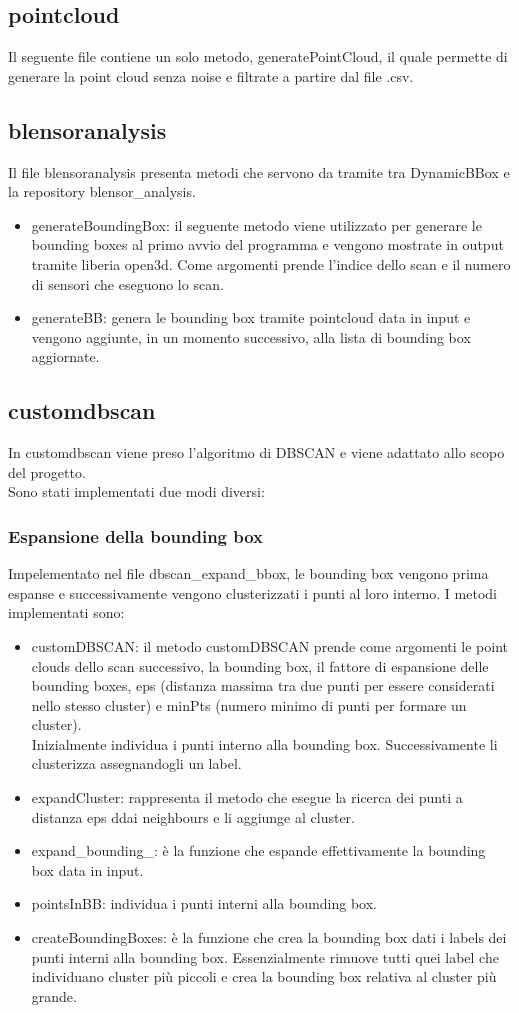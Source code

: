 \documentclass[italian]{article}
\begin{document}
\subsection{pointcloud}
Il seguente file contiene un solo metodo, generatePointCloud, il quale permette di generare la point cloud senza noise e filtrate a partire dal file .csv.\\
\subsection{blensoranalysis}
Il file blensoranalysis presenta metodi che servono da tramite tra DynamicBBox e la repository blensor\_analysis.
\begin{itemize}
		\item generateBoundingBox: il seguente metodo viene utilizzato per generare le bounding boxes al primo avvio del programma e vengono mostrate in output tramite liberia open3d. Come argomenti prende
			l'indice dello scan e il numero di sensori che eseguono lo scan. 
 		\item generateBB: genera le bounding box tramite pointcloud data in input e vengono aggiunte, in un momento successivo, alla lista di bounding box aggiornate.
\end{itemize}
\subsection{customdbscan}
In customdbscan viene preso l'algoritmo di DBSCAN e viene adattato allo scopo del progetto.\\
Sono stati implementati due modi diversi:
\subsubsection{Espansione della bounding box}
Impelementato nel file dbscan\_expand\_bbox, le bounding box vengono prima espanse e successivamente vengono clusterizzati i punti al loro interno.
I metodi implementati sono:
\begin{itemize}
	\item customDBSCAN: il metodo customDBSCAN prende come argomenti le point clouds dello scan successivo, la bounding box, il fattore di espansione delle bounding boxes, eps (distanza massima tra due punti per essere considerati nello stesso cluster) e minPts (numero minimo di punti per formare un cluster).\\ Inizialmente individua i punti interno alla bounding box. Successivamente li clusterizza assegnandogli un label.
	\item expandCluster: rappresenta il metodo che esegue la ricerca dei punti a distanza eps ddai neighbours e li aggiunge al cluster.
	\item expand\_bounding\_: è la funzione che espande effettivamente la bounding box data in input.
	\item pointsInBB: individua i punti interni alla bounding box.
	\item createBoundingBoxes: è la funzione che crea la bounding box dati i labels dei punti interni alla bounding box. Essenzialmente rimuove tutti quei label che individuano cluster più piccoli e crea la bounding box relativa al cluster più grande.
\end{itemize}
\end{document}
